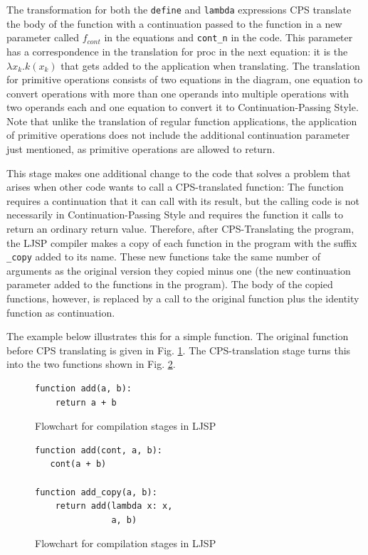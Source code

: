 \documentclass[11pt]{report}
\begin{document}
The transformation for both the \texttt{define} and \texttt{lambda} expressions CPS translate the body of the function with a continuation passed to the function in a new parameter called $f_{cont}$ in the equations and \texttt{cont_n} in the code. This parameter has a correspondence in the translation for proc in the next equation: it is the $\lambda x_k.k(x_k)$ that gets added to the application when translating. The translation for primitive operations consists of two equations in the diagram, one equation to convert operations with more than one operands into multiple operations with two operands each and one equation to convert it to Continuation-Passing Style. Note that unlike the translation of regular function applications, the application of primitive operations does not include the additional continuation parameter just mentioned, as primitive operations are allowed to return.

This stage makes one additional change to the code that solves a problem that arises when other code wants to call a CPS-translated function: The function requires a continuation that it can call with its result, but the calling code is not necessarily in Continuation-Passing Style and requires the function it calls to return an ordinary return value. Therefore, after CPS-Translating the program, the LJSP compiler makes a copy of each function in the program with the suffix \texttt{_copy} added to its name. These new functions take the same number of arguments as the original version they copied minus one (the new continuation parameter added to the functions in the program). The body of the copied functions, however, is replaced by a call to the original function plus the identity function as continuation. 

The example below illustrates this for a simple function. The original function before CPS translating is given in Fig. \ref{cpsdetail1}. The CPS-translation stage turns this into the two functions shown in Fig. \ref{cpsdetail2}.

\begin{figure}[ht]
\begin{lstlisting}
function add(a, b):
    return a + b
\end{lstlisting}
\caption{Flowchart for compilation stages in LJSP}
\label{cpsdetail1}
\end{figure}

\begin{figure}[ht]
\begin{lstlisting}
function add(cont, a, b):
   cont(a + b)
   
function add_copy(a, b):
    return add(lambda x: x, 
               a, b)
\end{lstlisting}
\caption{Flowchart for compilation stages in LJSP}
\label{cpsdetail2}
\end{figure}
\end{document}
